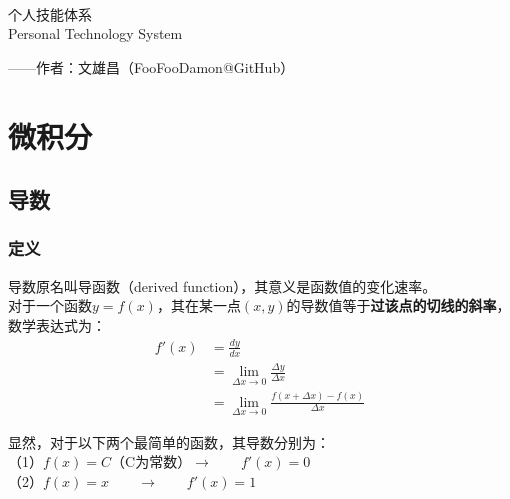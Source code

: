 \documentclass[12pt]{article}
\begin{document}
\begin{center}
\quad\vspace{4cm}\\
\Huge{个人技能体系}\vspace{8pt}\\
\Large{Personal Technology System}\vspace{32pt}\\
\end{center}
\begin{flushright}
\large{——作者：文雄昌（FooFooDamon@GitHub）\qquad}
\end{flushright}


\newpage

\tableofcontents
\newpage

\section{微积分}

\subsection{导数}

\subsubsection{定义}

导数原名叫导函数（derived function），其意义是函数值的变化速率。\\
对于一个函数$y = f(x)$，其在某一点$(x, y)$的导数值等于\textbf{过该点的切线的斜率}，数学表达式为：\\

\begin{equation*}
\begin{aligned}
f'(x) & = \frac{dy}{dx}\\
& = \lim_{\Delta x \to 0}\frac{\Delta y}{\Delta x}\\
& = \lim_{\Delta x \to 0}\frac{f(x + \Delta x) - f(x)}{\Delta x}
\end{aligned}
\end{equation*}

显然，对于以下两个最简单的函数，其导数分别为：\\
（1）$f(x) = C$（C为常数）\qquad $\to \qquad f'(x) = 0$\\
（2）$f(x) = x \qquad \to \qquad f'(x) = 1$
\end{document}
